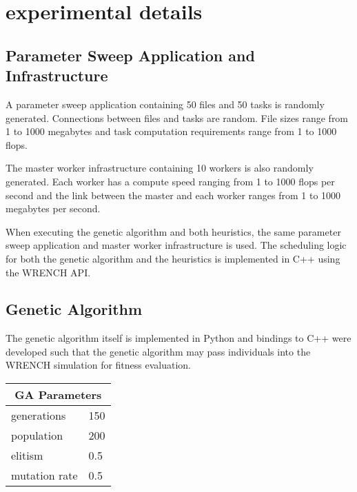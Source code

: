 \section{experimental details}
\label{sec:experimental_details}

\subsection*{Parameter Sweep Application and Infrastructure}
A parameter sweep application containing 50 files and 50 tasks is randomly
generated. Connections between files and tasks are random. File sizes range from
1 to 1000 megabytes and task computation requirements range from 1 to 1000 flops.

The master worker infrastructure containing 10 workers is also randomly
generated. Each worker has a compute speed ranging from 1 to 1000 flops per second
and the link between the master and each worker ranges from 1 to 1000 megabytes
per second.

When executing the genetic algorithm and both heuristics, the same parameter
sweep application and master worker infrastructure is used. The scheduling
logic for both the genetic algorithm and the heuristics is implemented in C++
using the WRENCH API.

\subsection*{Genetic Algorithm}
The genetic algorithm itself is implemented in Python and bindings to C++
were developed such that the genetic algorithm may pass individuals into the
WRENCH simulation for fitness evaluation.

\begin{table}[h]
  \begin{center}
\begin{tabular}{lllll}
\multicolumn{5}{c}{\textbf{GA Parameters}}      \\
\midrule
generations       & \multicolumn{4}{l}{150}     \\
population        & \multicolumn{4}{l}{200}     \\
elitism           & \multicolumn{4}{l}{0.5} \\
mutation rate     & \multicolumn{4}{l}{0.5} \\
\bottomrule
\end{tabular}
\end{center}
\end{table}
